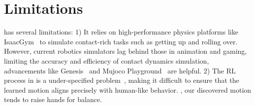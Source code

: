 \section{Limitations}
\ours has several limitations: 1) It relies on high-performance physics platforms like IsaacGym~\cite{IsaacGym21} to simulate contact-rich tasks such as getting up and rolling over. 
However, current robotics simulators lag behind those in animation and gaming, limiting the accuracy and efficiency of contact dynamics simulation, advancements like Genesis~\cite{Genesis24} and Mujoco Playground~\cite{MujocoPlayground25} are helpful.
2) The RL process in \ours is a under-specified problem~\cite{TaskSpecificationProblem22,RewardHackingBlog24}, making it difficult to ensure that the learned motion aligns precisely with human-like behavior. 
\eg, our discovered motion tends to raise hands for balance. 